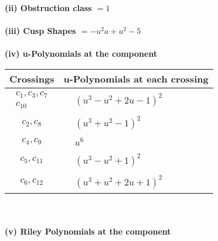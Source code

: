 \documentclass[1p]{elsarticle_modified}
\theoremstyle{definition}
\begin{document}
\flushleft \textbf{(ii) Obstruction class $= 1$}\\~\\
\flushleft \textbf{(iii) Cusp Shapes $= - u^2 a+u^2-5$}\\~\\
\newpage\renewcommand{\arraystretch}{1}
\flushleft \textbf{(iv) u-Polynomials at the component}\newline \\
\begin{tabular}{m{50pt}|m{274pt}}
Crossings & \hspace{64pt}u-Polynomials at each crossing \\
\hline $$\begin{aligned}c_{1},c_{3},c_{7}\\c_{10}\end{aligned}$$&$\begin{aligned}
&(u^3- u^2+2 u-1)^2
\end{aligned}$\\
\hline $$\begin{aligned}c_{2},c_{8}\end{aligned}$$&$\begin{aligned}
&(u^3+u^2-1)^2
\end{aligned}$\\
\hline $$\begin{aligned}c_{4},c_{9}\end{aligned}$$&$\begin{aligned}
&u^6
\end{aligned}$\\
\hline $$\begin{aligned}c_{5},c_{11}\end{aligned}$$&$\begin{aligned}
&(u^3- u^2+1)^2
\end{aligned}$\\
\hline $$\begin{aligned}c_{6},c_{12}\end{aligned}$$&$\begin{aligned}
&(u^3+u^2+2 u+1)^2
\end{aligned}$\\
\hline
\end{tabular}\\~\\
\newpage\renewcommand{\arraystretch}{1}
\flushleft \textbf{(v) Riley Polynomials at the component}\newline \\
\end{document}
